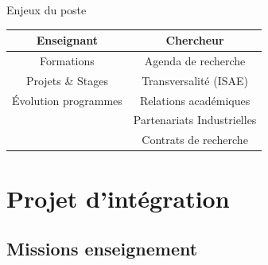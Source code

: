 \documentclass[aspectratio=169, french]{beamer}
\begin{document}
\begin{frame}{Enjeux du poste}
	\centering
	\begin{tcolorbox}[hbox]
		\begin{tabular}{c|c}
			\textbf{Enseignant}	& \textbf{Chercheur}  \\
			\hline
			Formations	& Agenda de recherche \\
			Projets \& Stages	& Transversalité (ISAE)  \\
			Évolution programmes & Relations académiques\\
			& Partenariats Industrielles \\
			& Contrats de recherche \\
		\end{tabular}
	\end{tcolorbox}
\end{frame}


\section{Projet d'intégration}


\subsection{Missions enseignement}
\end{document}
